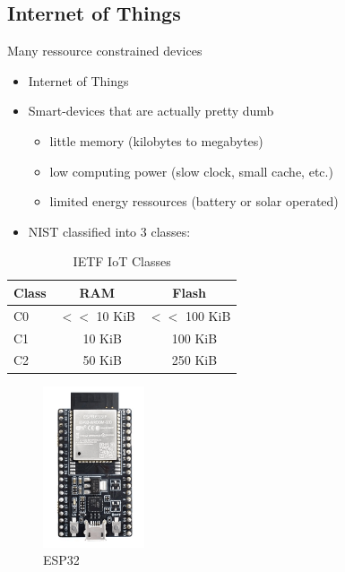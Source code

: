 \documentclass[ucs,10pt]{beamer}
\begin{document}
\subsection{Internet of Things}
\begin{frame}{Many ressource constrained devices}
  \begin{itemize}
  \item
    Internet of Things 
  \item
    Smart-devices that are actually pretty dumb
    \begin{itemize}
      \item little memory (kilobytes to megabytes)
      \item low computing power (slow clock, small cache, etc.)
      \item limited energy ressources (battery or solar operated)
    \end{itemize}
  \item
    NIST classified into 3 classes:
  \end{itemize}
  \begin{minipage}[t]{0.4\textwidth}
    \begin{table}
      \label{IoT-classes}
      \centering
      \caption{IETF IoT Classes}
      \begin{tabular}{|l | c c|}
          \hline
          Class & RAM & Flash \\
          \hline
          C0 & $<<$ 10 KiB & $<<$ 100 KiB\\
          C1 & ~ 10 KiB & ~ 100 KiB\\
          C2 & ~ 50 KiB & ~ 250 KiB\\
          \hline
      \end{tabular} 
  \end{table}
\end{minipage}
\begin{minipage}[t]{0.4\textwidth}
  \begin{figure}[htbp]
    \centering\hspace*{1.5cm}
    \includegraphics[width=3cm,angle=90,origin=l]{../graphics/ESP32-DevKitC-32D_t (1).png}
    \caption{ESP32\cite{img:esp}}
    \label{esp32}
  \end{figure}
\end{minipage}
\end{frame}
\end{document}
